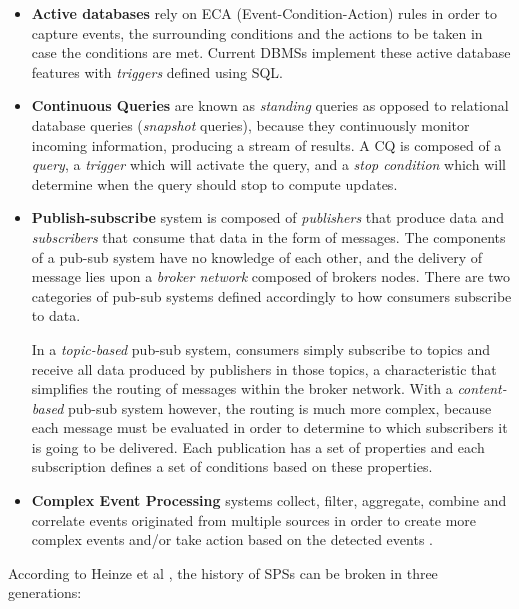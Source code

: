 \documentclass[ppgc,diss,english]{iiufrgs}
\begin{document}
\begin{itemize}
\item \textbf{Active databases} rely on ECA (Event-Condition-Action) rules in order to capture events, the surrounding conditions and the actions to be taken in case the conditions are met. Current DBMSs implement these active database features with \emph{triggers} defined using SQL.

\item \textbf{Continuous Queries} are known as \emph{standing} queries as opposed to relational database queries (\emph{snapshot} queries), because they continuously monitor incoming information, producing a stream of results. A CQ is composed of a \emph{query}, a \emph{trigger} which will activate the query, and a \emph{stop condition} which will determine when the query should stop to compute updates.

\item \textbf{Publish-subscribe} system is composed of \emph{publishers} that produce data and \emph{subscribers} that consume that data in the form of messages. The components of a pub-sub system have no knowledge of each other, and the delivery of message lies upon a \emph{broker network} composed of brokers nodes. There are two categories of pub-sub systems defined accordingly to how consumers subscribe to data.

In a \emph{topic-based} pub-sub system, consumers simply subscribe to topics and receive all data produced by publishers in those topics, a characteristic that simplifies the routing of messages within the broker network. With a \emph{content-based} pub-sub system however, the routing is much more complex, because each message must be evaluated in order to determine to which subscribers it is going to be delivered. Each publication has a set of properties and each subscription defines a set of conditions based on these properties.

\item \textbf{Complex Event Processing} systems collect, filter, aggregate, combine and correlate events originated from multiple sources in order to create more complex events and/or take action based on the detected events \cite{robins2010complex}.
\end{itemize}



According to Heinze et al \cite{heinze2014cloud}, the history of SPSs can be broken in three generations:
\end{document}
